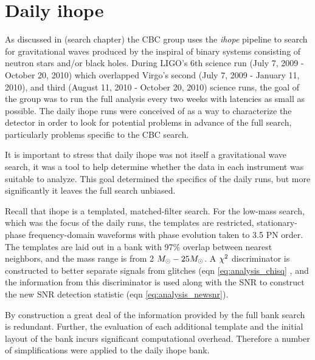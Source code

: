 \section{Daily ihope}

As discussed in (search chapter) the CBC group uses the \emph{ihope}
pipeline to search for gravitational waves produced by the inspiral of
binary systems consisting of neutron stars and/or black holes.  During
LIGO's 6th science run (July 7, 2009 - October 20, 2010) which
overlapped Virgo's second (July 7, 2009 - January 11, 2010), and third
(August 11, 2010 - October 20, 2010) science runs, the goal of the
group was to run the full analysis every two weeks with latencies as
small as possible.  The daily ihope runs were conceived of as a way to
characterize the detector in order to look for potential problems in
advance of the full search, particularly problems specific to the CBC
search.

It is important to stress that daily ihope was not itself a
gravitational wave search, it was a tool to help determine whether the
data in each instrument was suitable to analyze.  This goal determined
the specifics of the daily runs, but more significantly it leaves the
full search unbiased.

Recall that ihope is a templated, matched-filter search.  For the
low-mass search, which was the focus of the daily runs, the templates
are restricted, stationary-phase frequency-domain waveforms with phase
evolution taken to 3.5 PN order.  The templates are laid out in a bank
with 97\% overlap between nearest neighbors, and the mass range is
from 2 $M_\odot - 25 M_\odot$.  A $\chi^2$ discriminator is constructed to
better separate signals from glitches (eqn \ref{eq:analysis_chisq} ,
and the information from this discriminator is used along with the SNR
to construct the new SNR detection statistic (eqn
\ref{eq:analysis_newsnr}).

By construction a great deal of the information provided by
the full bank search is redundant.  Further, the evaluation of each
additional template and the initial layout of the bank incurs
significant computational overhead.  Therefore a number of
simplifications were applied to the daily ihope bank.

